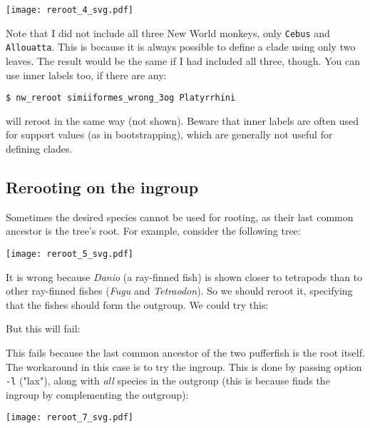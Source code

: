 

\begin{center}
\texttt{[image: reroot\_4\_svg.pdf]}
\end{center}

\noindent{}Note that I did not include all three New World monkeys, only \texttt{Cebus} and \texttt{Allouatta}. This is because it is always possible to define a clade using only two leaves. The result would be the same if I had included all three, though. You can use inner labels too, if there are any:
\begin{verbatim}
$ nw_reroot simiiformes_wrong_3og Platyrrhini
\end{verbatim}
will reroot in the same way (not shown). Beware that inner labels are often
used for support values (as in bootstrapping), which are generally not useful
for defining clades.

\subsection{Rerooting on the ingroup}

Sometimes the desired species cannot be used for rooting, as their last common ancestor is the tree's root. For example, consider the following tree:

\begin{center}
\texttt{[image: reroot\_5\_svg.pdf]}
\end{center}

\noindent{}It is wrong because \textit{Danio} (a ray-finned fish) is shown
closer to tetrapods than to other ray-finned fishes (\textit{Fugu} and
\textit{Tetraodon}). So we should reroot it, specifying that the fishes should
form the outgroup. We could try this:



\noindent{}But this will fail:



\noindent{}This fails because the last common ancestor of the two pufferfish is
the root itself. The workaround in this case is to try the ingroup. This is
done by passing option \texttt{-l} ("lax"), along with \emph{all} species in
the outgroup (this is because \reroot{} finds the ingroup by complementing the
outgroup):


\begin{center}
\texttt{[image: reroot\_7\_svg.pdf]}
\end{center}

